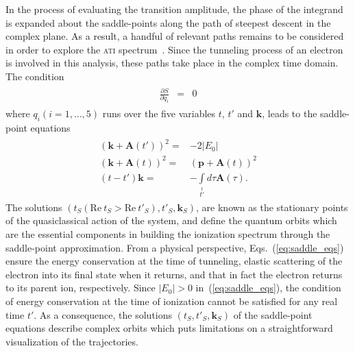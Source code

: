 In the process of evaluating the transition amplitude, the phase of
the integrand is expanded about the saddle-points along the path of
steepest descent in the complex plane. As a result, a handful of
relevant paths remains to be considered in order to explore the
\textsc{ati} spectrum~\cite{KopoldOptComm2000}. Since the tunneling
process of an electron is involved in this analysis, these paths take
place in the complex time domain.
%
The condition
\begin{eqnarray}
\label{eq:S_stationary}
\begin{split}
\frac{\partial S}{\partial q_{i}} & = & 0
\end{split}
\end{eqnarray}
where $q_{i}(i =1, \dots, 5)$ runs over the five variables $t$, $t'$
and $\mathbf{k}$, leads to the saddle-point
equations~\cite{Lewenstein_1995,KopoldOptComm2000}
%
\begin{eqnarray}
\label{eq:saddle_eqs}
\begin{split}
\left( \mathbf{k} + \mathbf{A}(t') \right)^{2} = &
-2|E_{0}| \\
\left( \mathbf{k} + \mathbf{A}(t)\right)^{2} = &
\left( \mathbf{p} + \mathbf{A}(t) \right)^{2} \\
(t - t') \mathbf{k} = & -\int\limits_{t'}\limits^{t}
d\tau \mathbf{A}(\tau).
\end{split}
\end{eqnarray}
%
The solutions $(t_{S}(\mathrm{Re}\ t_{S} > \mathrm{Re}\ t'_{S}),
t'_{S}, \mathbf{k}_{S})$, are known as the stationary points of the
quasiclassical action of the system, and define the quantum orbits
which are the essential components in building the ionization spectrum
through the saddle-point approximation. From a physical perspective,
Eqs.~(\ref{eq:saddle_eqs}) ensure the energy conservation at the time
of tunneling, elastic scattering of the electron into its final state
when it returns, and that in fact the electron returns to its parent
ion, respectively. Since $|E_{0}| > 0$ in~(\ref{eq:saddle_eqs}), the
condition of energy conservation at the time of ionization cannot be
satisfied for any real time $t'$. As a consequence, the solutions
$(t_{S}, t'_{S}, \mathbf{k}_{S})$ of the saddle-point equations
describe complex orbits which puts limitations on a straightforward
visualization of the trajectories.

